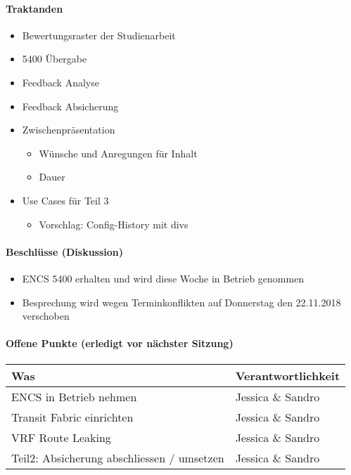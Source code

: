 \paragraph{Traktanden}
\begin{itemize}	
	\item Bewertungsraster der Studienarbeit
	\item  5400 Übergabe
	\item Feedback Analyse
	\item Feedback Absicherung
	\item Zwischenpräsentation 
	\begin{itemize}
		\item Wünsche und Anregungen für Inhalt
		\item Dauer
	\end{itemize}
	\item Use Cases für Teil 3
	\begin{itemize}
		\item Vorschlag: Config-History mit divs
	\end{itemize}
\end{itemize}

\paragraph{Beschlüsse (Diskussion)}
\begin{itemize}	
	\item ENCS 5400 erhalten und wird diese Woche in Betrieb genommen
	\item Besprechung wird wegen Terminkonflikten auf Donnerstag den 22.11.2018 verschoben
\end{itemize}

\paragraph{Offene Punkte (erledigt vor nächster Sitzung)} \mbox{}
\begin{table}[H]
	\centering
	\begin{tabularx}{\textwidth}{X | p{4.5cm}}
		\rowcolor{gray!50}
		\textbf{Was} & \textbf{Verantwortlichkeit} \\
		\hline
		ENCS in Betrieb nehmen & Jessica \& Sandro \\	
		Transit Fabric einrichten & Jessica \& Sandro  \\
		VRF Route Leaking & Jessica \& Sandro \\
		Teil2: Absicherung abschliessen / umsetzen & Jessica \& Sandro \\
	\end{tabularx}
	\label{tab:my-label}
\end{table}

